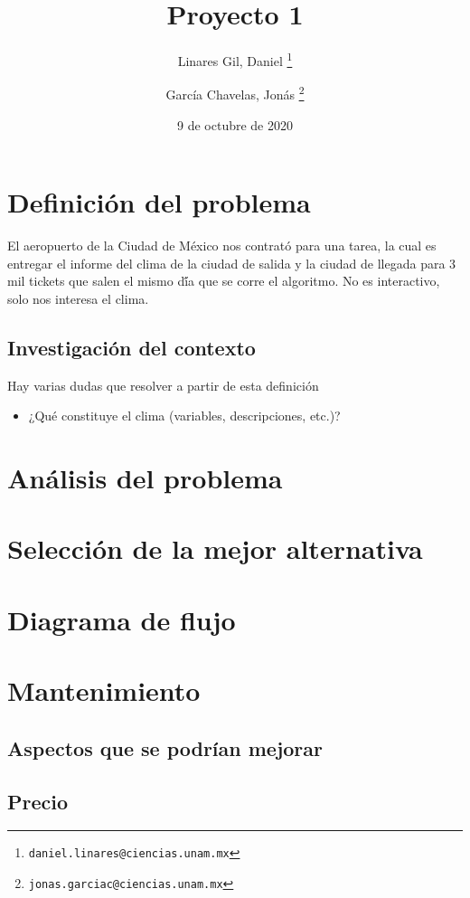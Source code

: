 \documentclass{report}
\author{
Linares Gil, Daniel
    \thanks{\texttt{daniel.linares@ciencias.unam.mx}}
    \and
García Chavelas, Jonás
    \thanks{\texttt{jonas.garciac@ciencias.unam.mx}}
}
\title{Proyecto 1}
\date{9 de octubre de 2020}
\begin{document}
\maketitle

\section*{Definición del problema}
El aeropuerto de la Ciudad de México nos contrató para una tarea, la cual
es entregar el informe del clima de la ciudad de salida y la ciudad de llegada para 3 mil tickets que
salen el mismo dí́a que se corre el algoritmo. No es interactivo, solo nos interesa el clima.


\subsection*{Investigación del contexto}
Hay varias dudas que resolver a partir de esta definición

\begin{itemize}
\item ¿Qué constituye el clima (variables, descripciones, etc.)?
\end{itemize}

\section*{Análisis del problema}

\section*{Selección de la mejor alternativa}

\section*{Diagrama de flujo}

\section*{Mantenimiento}

\subsection*{Aspectos que se podrían mejorar} 

\subsection*{Precio}
\end{document}
